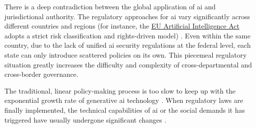 
There is a deep contradiction between the global application of \gls{ai} and jurisdictional authority. The regulatory approaches for \gls{ai} vary significantly across different countries and regions (for instance, the \href{https://artificialintelligenceact.eu/}{EU Artificial Intelligence Act} adopts a strict risk classification and rights-driven model) \cite[p.~1455]{devillers_ethical_2023}. Even within the same country, due to the lack of unified \gls{ai} security regulations at the federal level, each state can only introduce scattered policies on its own. This piecemeal regulatory situation greatly increases the difficulty and complexity of cross-departmental and cross-border governance.


The traditional, linear policy-making process is too slow to keep up with the exponential growth rate of generative \gls{ai} technology \cite[p.~83]{branch_ai_2025}. When regulatory laws are finally implemented, the technical capabilities of \gls{ai} or the social demands it has triggered have usually undergone significant changes \cite[p.~6373]{bakir_move_2025}.


